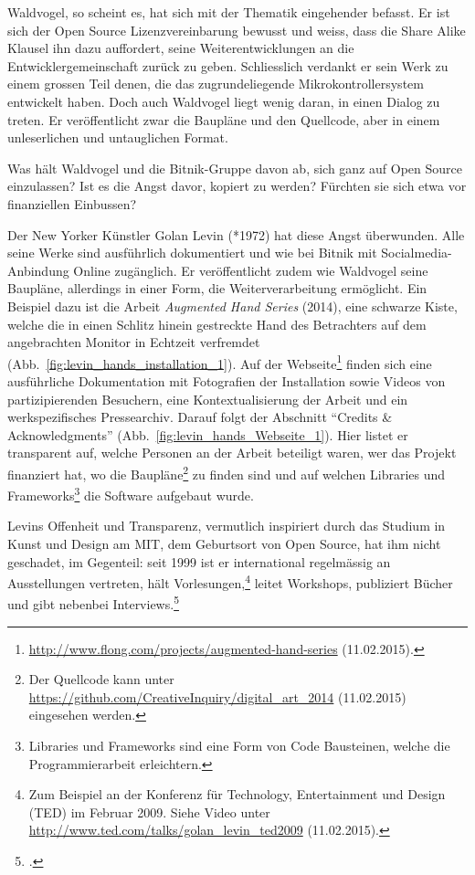 \documentclass[
paper=164mm:234mm, %
pagesize, %
DIV=calc, %
10pt, %
BCOR=0mm, %
parskip=half- %
]{scrbook}
\begin{document}
Waldvogel, so scheint es, hat sich mit der Thematik eingehender befasst. Er ist sich der Open Source Lizenzvereinbarung bewusst und weiss, dass die Share Alike Klausel ihn dazu auffordert, seine Weiterentwicklungen an die Entwicklergemeinschaft zurück zu geben. Schliesslich verdankt er sein Werk zu einem grossen Teil denen, die das zugrundeliegende Mikrokontrollersystem entwickelt haben. Doch auch Waldvogel liegt wenig daran, in einen Dialog zu treten. Er veröffentlicht zwar die Baupläne und den Quellcode, aber in einem unleserlichen und untauglichen Format.

Was hält Waldvogel und die Bitnik-Gruppe davon ab, sich ganz auf Open Source einzulassen? Ist es die Angst davor, kopiert zu werden? Fürchten sie sich etwa vor finanziellen Einbussen?

Der New Yorker Künstler Golan Levin (*1972) hat diese Angst überwunden. Alle seine Werke sind ausführlich dokumentiert und wie bei Bitnik mit Socialmedia-Anbindung Online zugänglich. Er veröffentlicht zudem wie Waldvogel seine Baupläne, allerdings in einer Form, die Weiterverarbeitung ermöglicht. Ein Beispiel dazu ist die Arbeit \emph{Augmented Hand Series} (2014), eine schwarze Kiste, welche die in einen Schlitz hinein gestreckte Hand des Betrachters auf dem angebrachten Monitor in Echtzeit verfremdet (Abb.~\ref{fig:levin_hands_installation_1}). Auf der Webseite\footnote{\url{http://www.flong.com/projects/augmented-hand-series} (11.02.2015).} finden sich eine ausführliche Dokumentation mit Fotografien der Installation sowie Videos von partizipierenden Besuchern, eine Kontextualisierung der Arbeit und ein werkspezifisches Pressearchiv. Darauf folgt der Abschnitt \enquote{Credits \& Acknowledgments} (Abb.~\ref{fig:levin_hands_Webseite_1}). Hier listet er transparent auf, welche Personen an der Arbeit beteiligt waren, wer das Projekt finanziert hat, wo die Baupläne\footnote{Der Quellcode kann unter \url{https://github.com/CreativeInquiry/digital_art_2014} (11.02.2015) eingesehen werden.} zu finden sind und auf welchen Libraries und Frameworks\footnote{Libraries und Frameworks sind eine Form von Code Bausteinen, welche die Programmierarbeit erleichtern.} die Software aufgebaut wurde.

Levins Offenheit und Transparenz, vermutlich inspiriert durch das Studium in Kunst und Design am MIT, dem Geburtsort von Open Source, hat ihm nicht geschadet, im Gegenteil: seit 1999 ist er international regelmässig an Ausstellungen vertreten, hält Vorlesungen,\footnote{Zum Beispiel an der Konferenz für Technology, Entertainment und Design (TED) im Februar 2009. Siehe Video unter \url{http://www.ted.com/talks/golan_levin_ted2009} (11.02.2015).} leitet Workshops, publiziert Bücher und gibt nebenbei Interviews.\footnote{\cite[144]{Hope-Ryan:2014}.}
\end{document}
